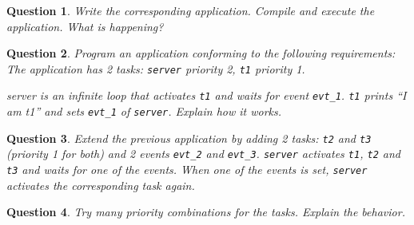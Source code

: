\documentclass[11pt]{article}
\newtheorem{ex}{Question}
\begin{document}
\begin{ex}
Write the corresponding application. Compile and execute the application. What is happening?
\end{ex}

\begin{ex}
Program an application conforming to the following requirements: The application has 2 tasks:
\texttt{server} priority 2, \texttt{t1} priority 1.

server is an infinite loop that activates \texttt{t1} and waits for event \texttt{evt_1}. \texttt{t1} prints ``I am t1'' and sets \texttt{evt_1} of \texttt{server}. Explain how it works.
\end{ex}

\begin{ex}
Extend the previous application by adding 2 tasks: \texttt{t2} and \texttt{t3} (priority 1 for both) and 2 events \texttt{evt_2} and \texttt{evt_3}. \texttt{server} activates \texttt{t1}, \texttt{t2} and \texttt{t3} and waits for one of the events. When one of the events is set, \texttt{server} activates the corresponding task again.
\end{ex}

\begin{ex}
Try many priority combinations for the tasks. Explain the behavior.
\end{ex}
\end{document}
